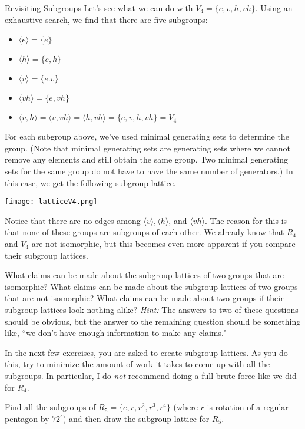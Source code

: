 \begin{section}{Revisiting Subgroups}
Let's see what we can do with \(V_4=\{e,v,h,vh\}\).  Using an exhaustive search, we find that there are five subgroups:
\begin{itemize}
\item[] \(\langle e \rangle = \{e\}\)
\item[] \(\langle h \rangle  = \{e,h\}\)
\item[] \(\langle v \rangle  = \{e.v\}\)
\item[] \(\langle vh \rangle  = \{e,vh\}\)
\item[] \(\langle v,h \rangle = \langle v,vh\rangle = \langle h, vh\rangle= \{e,v,h,vh\}=V_4\)
\end{itemize}
For each subgroup above, we've used minimal generating sets to determine the group.  (Note that minimal generating sets are generating sets where we cannot remove any elements and still obtain the same group.  Two minimal generating sets for the same group do not have to have the same number of generators.)  In this case, we get the following subgroup lattice.

\begin{center}
\texttt{[image: latticeV4.png]}
\end{center}

Notice that there are no edges among \(\langle v\rangle, \langle h\rangle\), and \(\langle vh\rangle\).  The reason for this is that none of these groups are subgroups of each other.  We already know that \(R_4\) and \(V_4\) are not isomorphic, but this becomes even more apparent if you compare their subgroup lattices.

\begin{problem}
What claims can be made about the subgroup lattices of two groups that are isomorphic? What claims can be made about the subgroup lattices of two groups that are not isomorphic?  What claims can be made about two groups if their subgroup lattices look nothing alike?  \emph{Hint:} The answers to two of these questions should be obvious, but the answer to the remaining question should be something like, ``we don't have enough information to make any claims."
\end{problem}

In the next few exercises, you are asked to create subgroup lattices.  As you do this, try to minimize the amount of work it takes to come up with all the subgroups.  In particular, I do \emph{not} recommend doing a full brute-force like we did for \(R_4\). 

\begin{exercise}
Find all the subgroups of \(R_5=\{e,r,r^2,r^3,r^4\}\) (where \(r\) is rotation of a regular pentagon by \(72^{\circ}\)) and then draw the subgroup lattice for \(R_5\).
\end{exercise}


\end{section}
